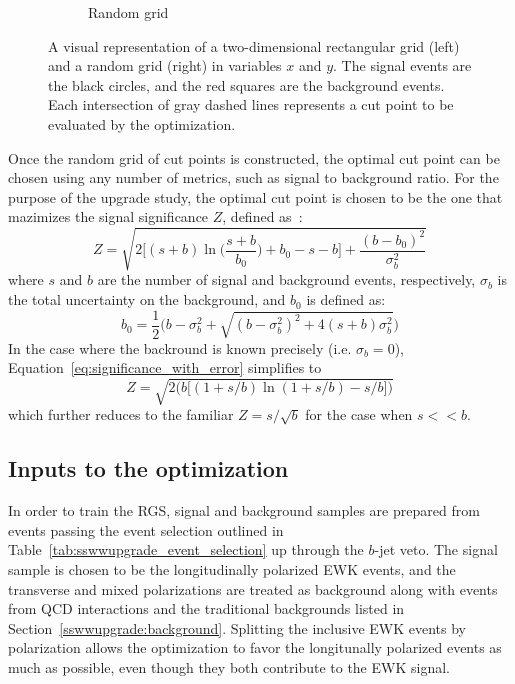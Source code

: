 \begin{figure}[htp]
\begin{subfigure}[b]{.48\textwidth}
    \caption{Random grid}
    \label{fig:rgs_grids_random}
  \end{subfigure}
  \caption{A visual representation of a two-dimensional rectangular grid (left) and a random grid (right) in variables $x$ and $y$.  The signal events are the black circles, and the red squares are the background events.  Each intersection of gray dashed lines represents a cut point to be evaluated by the optimization.}
  \label{fig:rgs_grids}
\end{figure}

Once the random grid of cut points is constructed, the optimal cut point can be chosen using any number of metrics, such as signal to background ratio.
For the purpose of the \ssww upgrade study, the optimal cut point is chosen to be the one that mazimizes the signal significance $Z$, defined as~\cite{2011.asimov-significance}:
\begin{equation}
Z = \sqrt{2{\bigg[}(s+b)\ln{\Big(}\frac{s+b}{b_0}{\Big)}+b_0-s-b{\bigg]}+\frac{(b-b_0)^2}{\sigma_b^2}}
\label{eq:significance_with_error}
\end{equation}
where $s$ and $b$ are the number of signal and background events, respectively, $\sigma_b$ is the total uncertainty on the background, and $b_0$ is defined as:
\begin{equation}
b_0 = \frac{1}{2}{\Big(}b-\sigma_b^2+\sqrt{(b-\sigma_b^2)^2+4(s+b)\sigma_b^2}{\Big)}
\label{eq:significance_b0}
\end{equation}
In the case where the backround is known precisely (i.e. $\sigma_b = 0$), Equation~\ref{eq:significance_with_error} simplifies to
\begin{equation}
Z = \sqrt{2\bigg(b\big[(1+s/b)\ln(1+s/b)-s/b\big]\bigg)}
\label{eq:significance_without_error}
\end{equation}
which further reduces to the familiar $Z = s/\sqrt{b}$ for the case when $s << b$.

%
\subsection{Inputs to the optimization}\label{sswwupgrade:opt_inputs}
In order to train the RGS, signal and background samples are prepared from events passing the event selection outlined in Table~\ref{tab:sswwupgrade_event_selection} up through the $b$-jet veto.
The signal sample is chosen to be the longitudinally polarized \ssww EWK events, and the transverse and mixed polarizations are treated as background along with \ssww events from QCD interactions and the traditional backgrounds listed in Section~\ref{sswwupgrade:background}.
Splitting the inclusive \ssww EWK events by polarization allows the optimization to favor the longitunally polarized events as much as possible, even though they both contribute to the EWK signal.

